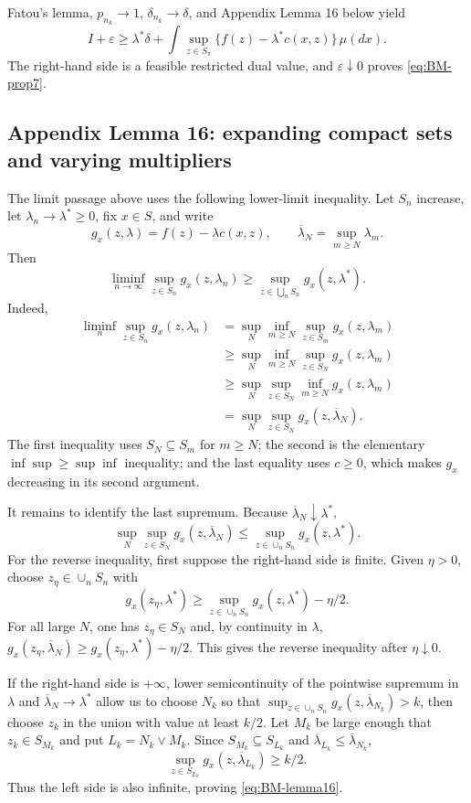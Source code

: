 Fatou's lemma, $p_{n_k}\to1$, $\delta_{n_k}\to\delta$, and Appendix Lemma 16 below yield
\[
 I+\varepsilon\ge
 \lambda^*\delta+
 \int\sup_{z\in S_\pi}\{f(z)-\lambda^*c(x,z)\}\,\mu(dx).
\]
The right-hand side is a feasible restricted dual value, and $\varepsilon\downarrow0$ proves
\eqref{eq:BM-prop7}.


\subsection{Appendix Lemma 16: expanding compact sets and varying multipliers}
The limit passage above uses the following lower-limit inequality.  Let $S_n$ increase, let
$\lambda_n\to\lambda^*\ge0$, fix $x\in S$, and write
\[
 g_x(z,\lambda)=f(z)-\lambda c(x,z),
 \qquad
 \overline\lambda_N=\sup_{m\ge N}\lambda_m.
\]
Then
\begin{equation}
 \liminf_{n\to\infty}\sup_{z\in S_n}g_x(z,\lambda_n)
 \ge
 \sup_{z\in\bigcup_nS_n}g_x(z,\lambda^*).
 \label{eq:BM-lemma16}
\end{equation}
Indeed,
\begin{align*}
 \liminf_n\sup_{z\in S_n}g_x(z,\lambda_n)
 &=\sup_N\inf_{m\ge N}\sup_{z\in S_m}g_x(z,\lambda_m)\\
 &\ge\sup_N\inf_{m\ge N}\sup_{z\in S_N}g_x(z,\lambda_m)\\
 &\ge\sup_N\sup_{z\in S_N}\inf_{m\ge N}g_x(z,\lambda_m)\\
 &=\sup_N\sup_{z\in S_N}g_x(z,\overline\lambda_N). \tag{54}
\end{align*}
The first inequality uses $S_N\subseteq S_m$ for $m\ge N$; the second is the elementary
$\inf\sup\ge\sup\inf$ inequality; and the last equality uses $c\ge0$, which makes $g_x$ decreasing
in its second argument.

It remains to identify the last supremum.  Because $\overline\lambda_N\downarrow\lambda^*$,
\[
 \sup_N\sup_{z\in S_N}g_x(z,\overline\lambda_N)
 \le \sup_{z\in\cup_nS_n}g_x(z,\lambda^*).
\]
For the reverse inequality, first suppose the right-hand side is finite.  Given $\eta>0$, choose
$z_\eta\in\cup_nS_n$ with
\[
 g_x(z_\eta,\lambda^*)\ge
 \sup_{z\in\cup_nS_n}g_x(z,\lambda^*)-\eta/2.
\]
For all large $N$, one has $z_\eta\in S_N$ and, by continuity in $\lambda$,
$g_x(z_\eta,\overline\lambda_N)\ge g_x(z_\eta,\lambda^*)-\eta/2$.  This gives the reverse
inequality after $\eta\downarrow0$.

If the right-hand side is $+\infty$, lower semicontinuity of the pointwise supremum in $\lambda$ and $\overline\lambda_N\to\lambda^*$ allow us to choose $N_k$ so that
$\sup_{z\in\cup_nS_n}g_x(z,\overline\lambda_{N_k})>k$, then choose $z_k$ in the union with value at
least $k/2$.  Let $M_k$ be large enough that $z_k\in S_{M_k}$ and put $L_k=N_k\vee M_k$.  Since
$S_{M_k}\subseteq S_{L_k}$ and $\overline\lambda_{L_k}\le\overline\lambda_{N_k}$,
\[
 \sup_{z\in S_{L_k}}g_x(z,\overline\lambda_{L_k})\ge k/2.
\]
Thus the left side is also infinite, proving \eqref{eq:BM-lemma16}.

